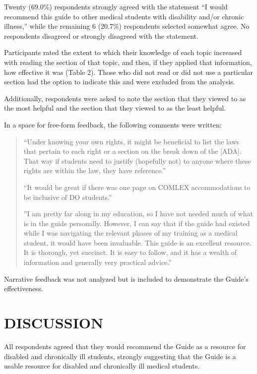 \documentclass[11.5pt]{sig-alternate} %
\begin{document}
\begin{large}
Twenty (69.0\%) respondents strongly agreed with the statement “I would recommend this guide to other medical students with disability and/or chronic illness,” while the remaining 6 (20.7\%) respondents selected somewhat agree. No respondents disagreed or strongly disagreed with the statement.


Participants rated the extent to which their knowledge of each topic increased with reading the section of that topic, and then, if they applied that information, how effective it was (Table 2). Those who did not read or did not use a particular section had the option to indicate this and were excluded from the analysis.


Additionally, respondents were asked to note the section that they viewed to as the most helpful and the section that they viewed to as the least helpful.


In a space for free-form feedback, the following comments were written:

\begin{quote}
    ``Under knowing your own rights, it might be beneficial to list the laws that pertain to each right or a section on the break down of the [ADA]. That way if students need to justify (hopefully not) to anyone where these rights are within the law, they have reference.''

    ``It would be great if there was one page on COMLEX accommodations to be inclusive of DO students.''

    ''I am pretty far along in my education, so I have not needed much of what is in the guide personally. However, I can say that if the guide had existed while I was navigating the relevant phases of my training as a medical student, it would have been invaluable. This guide is an excellent resource. It is thorough, yet succinct. It is easy to follow, and it has a wealth of information and generally very practical advice.''
\end{quote}

Narrative feedback was not analyzed but is included to demonstrate the Guide’s effectiveness.

\section*{DISCUSSION}
All respondents agreed that they would recommend the Guide as a resource for disabled and chronically ill students, strongly suggesting that the Guide is a usable resource for disabled and chronically ill medical students.


\end{large}
\end{document}
